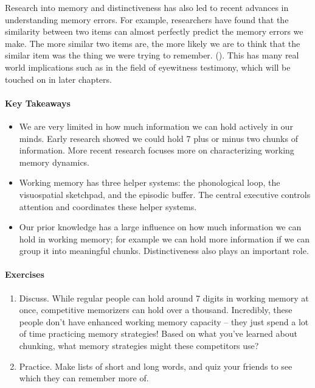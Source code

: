 \documentclass[
]{krantz}
\providecommand{\tightlist}{%
  \setlength{\itemsep}{0pt}\setlength{\parskip}{0pt}}
\begin{document}
Research into memory and distinctiveness has also led to recent advances in understanding memory errors. For example, researchers have found that the similarity between two items can almost perfectly predict the memory errors we make. The more similar two items are, the more likely we are to think that the similar item was the thing we were trying to remember. (). This has many real world implications such as in the field of eyewitness testimony, which will be touched on in later chapters.

\paragraph*{Key Takeaways}\label{key-takeaways-3}

\begin{itemize}
\tightlist
\item
  We are very limited in how much information we can hold actively in our minds. Early research showed we could hold 7 plus or minus two chunks of information. More recent research focuses more on characterizing working memory dynamics.
\item
  Working memory has three helper systems: the phonological loop, the visuospatial sketchpad, and the episodic buffer. The central executive controls attention and coordinates these helper systems.
\item
  Our prior knowledge has a large influence on how much information we can hold in working memory; for example we can hold more information if we can group it into meaningful chunks. Distinctiveness also plays an important role.
\end{itemize}

\paragraph*{Exercises}\label{exercises-3}

\begin{enumerate}
\def\labelenumi{\arabic{enumi}.}
\tightlist
\item
  Discuss. While regular people can hold around 7 digits in working memory at once, competitive memorizers can hold over a thousand. Incredibly, these people don't have enhanced working memory capacity -- they just spend a lot of time practicing memory strategies! Based on what you've learned about chunking, what memory strategies might these competitors use?
\item
  Practice. Make lists of short and long words, and quiz your friends to see which they can remember more of.
\end{enumerate}
\end{document}

